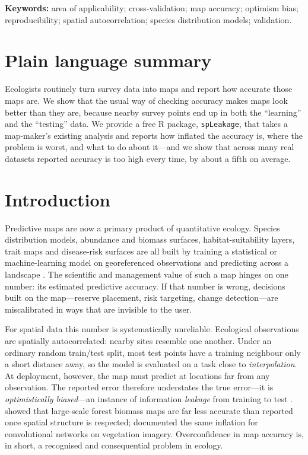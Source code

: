 \documentclass[11pt,a4paper]{article}
\begin{document}
\medskip
\noindent\textbf{Keywords:} area of applicability; cross-validation; map accuracy;
optimism bias; reproducibility; spatial autocorrelation; species distribution
models; validation.

\section*{Plain language summary}
\noindent Ecologists routinely turn survey data into maps and report how accurate
those maps are. We show that the usual way of checking accuracy makes maps look
better than they are, because nearby survey points end up in both the ``learning''
and the ``testing'' data. We provide a free R package, \texttt{spLeakage}, that
takes a map-maker's existing analysis and reports how inflated the accuracy is,
where the problem is worst, and what to do about it---and we show that across many
real datasets reported accuracy is too high every time, by about a fifth on average.

\section{Introduction}\label{sec:intro}

Predictive maps are now a primary product of quantitative ecology. Species
distribution models, abundance and biomass surfaces, habitat-suitability layers,
trait maps and disease-risk surfaces are all built by training a statistical or
machine-learning model on georeferenced observations and predicting across a
landscape \citep{araujo2019standards, zurell2020odmap}. The scientific and
management value of such a map hinges on one number: its estimated predictive
accuracy. If that number is wrong, decisions built on the map---reserve placement,
risk targeting, change detection---are miscalibrated in ways that are invisible to
the user.

For spatial data this number is systematically unreliable. Ecological observations
are spatially autocorrelated: nearby sites resemble one another. Under an ordinary
random train/test split, most test points have a training neighbour only a short
distance away, so the model is evaluated on a task close to \emph{interpolation}.
At deployment, however, the map must predict at locations far from any observation.
The reported error therefore understates the true error---it is
\emph{optimistically biased}---an instance of information \emph{leakage} from
training to test \citep{roberts2017crossvalidation, ploton2020spatial,
kattenborn2022spatially}. \citet{ploton2020spatial} showed that large-scale forest
biomass maps are far less accurate than reported once spatial structure is
respected; \citet{kattenborn2022spatially} documented the same inflation for
convolutional networks on vegetation imagery. Overconfidence in map accuracy is, in
short, a recognised and consequential problem in ecology.
\end{document}
